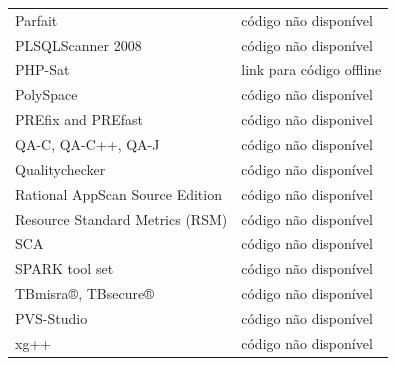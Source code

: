 \documentclass[qual, classic, a4paper]{ufbathesis}
\begin{document}
\begin{table}
\begin{tabular}{| l | l |}
Parfait                   & código não disponível \\
PLSQLScanner 2008         & código não disponível \\
PHP-Sat                   & link para código offline \\
PolySpace                 & código não disponível \\
PREfix and PREfast        & código não disponivel \\
QA-C, QA-C++, QA-J        & código não disponível \\
Qualitychecker            & código não disponível \\
Rational AppScan Source Edition & código não disponível \\
Resource Standard Metrics (RSM) & código não disponível \\
SCA                       & código não disponível \\
SPARK tool set            & código não disponível \\
TBmisra®, TBsecure®       & código não disponível \\
PVS-Studio                & código não disponível \\
xg++                      & código não disponível \\
\hline
\end{tabular}
\label{ferramentas-do-nist-sem-codigo}
\end{table}
\end{document}
